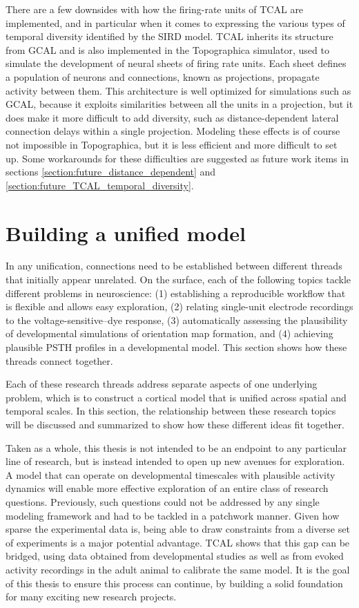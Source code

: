 \documentclass[phd,ianc,twoside]{infthesis}
\begin{document}
There are a few downsides with how the firing-rate units of TCAL are
implemented, and in particular when it comes to expressing the various types of temporal
diversity identified by the SIRD model. TCAL inherits its structure from
GCAL and is also implemented in the Topographica simulator, used
to simulate the development of neural sheets of firing rate units. Each
sheet defines a population of neurons and connections, known as
projections, propagate activity between them. This architecture is well
optimized for simulations such as GCAL, because it exploits
similarities between all the units in a projection, but it does make
it more difficult to add diversity, such as distance-dependent lateral
connection delays within a single projection.  Modeling these effects is
of course not impossible in Topographica, but it is less efficient and
more difficult to set up.  Some workarounds for these difficulties are
suggested as future work items in sections
\ref{section:future_distance_dependent} and 
\ref{section:future_TCAL_temporal_diversity}.


\section{Building a unified model}

In any unification, connections need to be established between different
threads that initially appear unrelated. On the surface, each of the
following topics tackle different problems in neuroscience: (1)
establishing a reproducible workflow that is flexible and allows easy
exploration, (2) relating single-unit electrode recordings to the
voltage-sensitive--dye response, (3) automatically assessing the
plausibility of developmental simulations of orientation map formation,
and (4) achieving plausible PSTH profiles in a developmental model. This
section shows how these threads connect together.

Each of these research threads address separate aspects of one
underlying problem, which is to construct a cortical model that is
unified across spatial and temporal scales. In this section, the
relationship between these research topics will be discussed and
summarized to show how these different ideas fit together.

Taken as a whole, this thesis is not intended to be an endpoint to any
particular line of research, but is instead intended to open up new avenues for
exploration. A model that can operate on developmental timescales with
plausible activity dynamics will enable more effective exploration of an
entire class of research questions. Previously, such questions could not
be addressed by any single modeling framework and had to be tackled in a
patchwork manner. Given how sparse the experimental data is, being
able to draw constraints from a diverse set of experiments is a major
potential advantage.  TCAL shows that this gap can be bridged, using data
obtained from developmental studies as well as from evoked activity
recordings in the adult animal to calibrate the same model. It is the goal
of this thesis to ensure this process can continue, by building a
solid foundation for many exciting new research projects.
\end{document}
